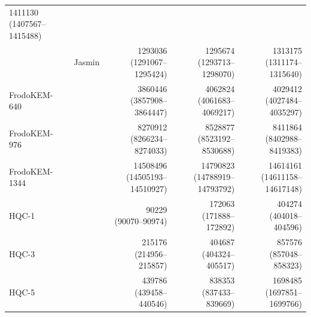 \begin{table}[h]
\begin{tabular}{llrrr}
\makecell[r]{1411130\\(1407567--1415488)} \\
\kaiburr-6144 & Jasmin &
\makecell[r]{1293036\\(1291067--1295424)} &
\makecell[r]{1295674\\(1293713--1298070)} &
\makecell[r]{1313175\\(1311174--1315640)} \\
\midrule
FrodoKEM-640 & \cite{frodoKEM-github} &
\makecell[r]{3860446\\(3857908--3864447)} &
\makecell[r]{4062824\\(4061683--4069217)} &
\makecell[r]{4029412\\(4027484--4035297)} \\
FrodoKEM-976 & \cite{frodoKEM-github} &
\makecell[r]{8270912\\(8266234--8274033)} &
\makecell[r]{8528877\\(8523192--8530688)} &
\makecell[r]{8411864\\(8402988--8419383)} \\
FrodoKEM-1344 & \cite{frodoKEM-github} &
\makecell[r]{14508496\\(14505193--14510927)} &
\makecell[r]{14790823\\(14788919--14793792)} &
\makecell[r]{14614161\\(14611158--14617148)} \\
\midrule
HQC-1 & \cite{hqc-github} &
\makecell[r]{90229\\(90070--90974)} &
\makecell[r]{172063\\(171888--172892)} &
\makecell[r]{404274\\(404018--404596)} \\
HQC-3 & \cite{hqc-github} &
\makecell[r]{215176\\(214956--215857)} &
\makecell[r]{404687\\(404324--405517)} &
\makecell[r]{857576\\(857048--858323)} \\
HQC-5 & \cite{hqc-github} &
\makecell[r]{439786\\(439458--440546)} &
\makecell[r]{838353\\(837433--839669)} &
\makecell[r]{1698485\\(1697851--1699766)} \\
\bottomrule
\end{tabular}
\end{table}

